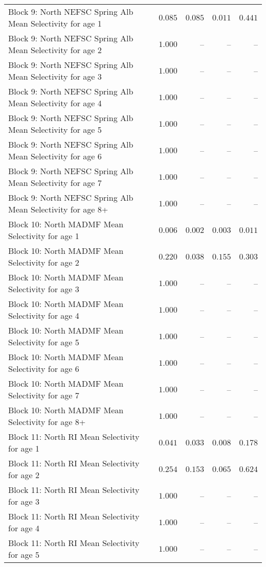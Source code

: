 \documentclass[
]{article}
\begin{document}
\begin{landscape}
\begin{longtable}[t]{lrrrr}
Block 9: North NEFSC Spring Alb Mean Selectivity for age 1 & $0.085$ & $0.085$ & $0.011$ & $0.441$\\
Block 9: North NEFSC Spring Alb Mean Selectivity for age 2 & $1.000$ & -- & -- & --\\
Block 9: North NEFSC Spring Alb Mean Selectivity for age 3 & $1.000$ & -- & -- & --\\
Block 9: North NEFSC Spring Alb Mean Selectivity for age 4 & $1.000$ & -- & -- & --\\
\addlinespace
Block 9: North NEFSC Spring Alb Mean Selectivity for age 5 & $1.000$ & -- & -- & --\\
Block 9: North NEFSC Spring Alb Mean Selectivity for age 6 & $1.000$ & -- & -- & --\\
Block 9: North NEFSC Spring Alb Mean Selectivity for age 7 & $1.000$ & -- & -- & --\\
Block 9: North NEFSC Spring Alb Mean Selectivity for age 8+ & $1.000$ & -- & -- & --\\
Block 10: North MADMF Mean Selectivity for age 1 & $0.006$ & $0.002$ & $0.003$ & $0.011$\\
\addlinespace
Block 10: North MADMF Mean Selectivity for age 2 & $0.220$ & $0.038$ & $0.155$ & $0.303$\\
Block 10: North MADMF Mean Selectivity for age 3 & $1.000$ & -- & -- & --\\
Block 10: North MADMF Mean Selectivity for age 4 & $1.000$ & -- & -- & --\\
Block 10: North MADMF Mean Selectivity for age 5 & $1.000$ & -- & -- & --\\
Block 10: North MADMF Mean Selectivity for age 6 & $1.000$ & -- & -- & --\\
\addlinespace
Block 10: North MADMF Mean Selectivity for age 7 & $1.000$ & -- & -- & --\\
Block 10: North MADMF Mean Selectivity for age 8+ & $1.000$ & -- & -- & --\\
Block 11: North RI Mean Selectivity for age 1 & $0.041$ & $0.033$ & $0.008$ & $0.178$\\
Block 11: North RI Mean Selectivity for age 2 & $0.254$ & $0.153$ & $0.065$ & $0.624$\\
Block 11: North RI Mean Selectivity for age 3 & $1.000$ & -- & -- & --\\
\addlinespace
Block 11: North RI Mean Selectivity for age 4 & $1.000$ & -- & -- & --\\
Block 11: North RI Mean Selectivity for age 5 & $1.000$ & -- & -- & --\\

\end{longtable}
\end{landscape}
\end{document}
